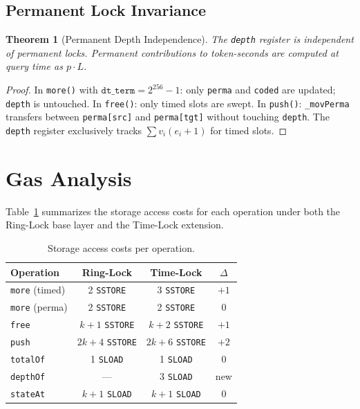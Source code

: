 \documentclass[10pt,a4paper,twocolumn]{article}
\theoremstyle{definition}
\theoremstyle{plain}
\newtheorem{theorem}{Theorem}[section]
\theoremstyle{remark}
\begin{document}
\subsection{Permanent Lock Invariance}

\begin{theorem}[Permanent Depth Independence]
\label{thm:perma-independence}
The \texttt{depth} register is independent of permanent locks. Permanent contributions to token-seconds are computed at query time as $p \cdot L$.
\end{theorem}

\begin{proof}
In \texttt{more()} with $\texttt{dt\_term} = 2^{256}{-}1$: only \texttt{perma} and \texttt{coded} are updated; \texttt{depth} is untouched. In \texttt{free()}: only timed slots are swept. In \texttt{push()}: \texttt{\_movPerma} transfers between \texttt{perma[src]} and \texttt{perma[tgt]} without touching \texttt{depth}. The \texttt{depth} register exclusively tracks $\sum v_i(e_i{+}1)$ for timed slots.
\end{proof}

\FloatBarrier

\section{Gas Analysis}
\label{sec:gas}

Table~\ref{tab:gas} summarizes the storage access costs for each operation under both the Ring-Lock base layer and the Time-Lock extension.

\begin{table}[htbp]
\centering
\caption{Storage access costs per operation.}
\label{tab:gas}
\small
\begin{tabular}{@{}lccc@{}}
\toprule
Operation & Ring-Lock & Time-Lock & $\Delta$ \\
\midrule
\texttt{more} (timed) & 2 \texttt{SSTORE} & 3 \texttt{SSTORE} & $+1$ \\
\texttt{more} (perma) & 2 \texttt{SSTORE} & 2 \texttt{SSTORE} & $0$ \\
\texttt{free} & $k{+}1$ \texttt{SSTORE} & $k{+}2$ \texttt{SSTORE} & $+1$ \\
\texttt{push} & $2k{+}4$ \texttt{SSTORE} & $2k{+}6$ \texttt{SSTORE} & $+2$ \\
\texttt{totalOf} & 1 \texttt{SLOAD} & 1 \texttt{SLOAD} & $0$ \\
\texttt{depthOf} & --- & 3 \texttt{SLOAD} & new \\
\texttt{stateAt} & $k{+}1$ \texttt{SLOAD} & $k{+}1$ \texttt{SLOAD} & $0$ \\
\bottomrule
\end{tabular}
\end{table}
\end{document}
